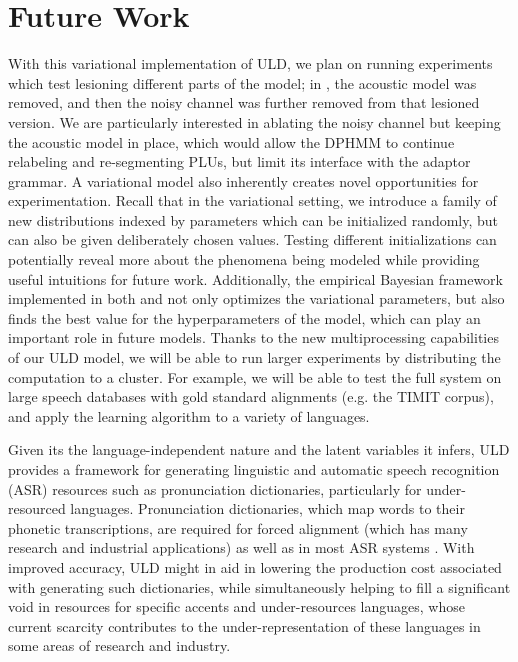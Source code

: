 \documentclass[12pt,letterpaper]{article}
\begin{document}
\section{Future Work}
With this variational implementation of ULD, we plan on running experiments which test lesioning different parts of the model; in \citet{lee:2015}, the acoustic model was removed, and then the noisy channel was further removed from that lesioned version. We are particularly interested in ablating the noisy channel but keeping the acoustic model in place, which would allow the DPHMM to continue relabeling and re-segmenting PLUs, but limit its interface with the adaptor grammar. A variational model also inherently creates novel opportunities for experimentation. Recall that in the variational setting, we introduce a family of new distributions indexed by parameters which can be initialized randomly, but can also be given deliberately chosen values. Testing different initializations can potentially reveal more about the phenomena being modeled while providing useful intuitions for future work. Additionally, the empirical Bayesian framework implemented in both \citet{zhai:2014} and \citet{ondel:2016} not only optimizes the variational parameters, but also finds the best value for the hyperparameters of the model, which can play an important role in future models. Thanks to the new multiprocessing capabilities of our ULD model, we will be able to run larger experiments by distributing the computation to a cluster. For example, we will be able to test the full system on large speech databases with gold standard alignments (e.g. the TIMIT corpus), and apply the learning algorithm to a variety of languages. 

Given its the language-independent nature and the latent variables it infers, ULD provides a framework for generating linguistic and automatic speech recognition (ASR) resources such as pronunciation dictionaries, particularly for under-resourced languages. Pronunciation dictionaries, which map words to their phonetic transcriptions, are required for forced alignment (which has many research and industrial applications) as well as in most ASR systems \citep{besacier:2014}. With improved accuracy, ULD might in aid in lowering the production cost associated with generating such dictionaries, while simultaneously helping to fill a significant void in resources for specific accents and under-resources languages, whose current scarcity contributes to the under-representation of these languages in some areas of research and industry. 
\end{document}

